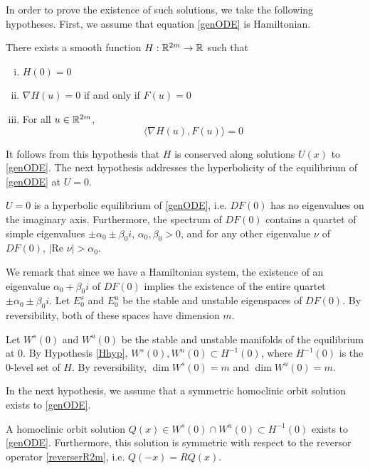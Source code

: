 \documentclass[thesis.tex]{subfiles}
\begin{document}
In order to prove the existence of such solutions, we take the following hypotheses. First, we assume that equation \eqref{genODE} is Hamiltonian.
\begin{hypothesis}\label{Hhyp}
There exists a smooth function $H: {\mathbb R}^{2m} \rightarrow {\mathbb R}$ such that 
\begin{enumerate}[(i)]
\item $H(0) = 0$
\item $\nabla H(u) = 0$ if and only if $F(u) = 0$
\item For all $u \in {\mathbb R}^{2m}$,
\begin{equation}
\langle \nabla H(u), F(u) \rangle = 0
\end{equation}
\end{enumerate}
\end{hypothesis}
It follows from this hypothesis that $H$ is conserved along solutions $U(x)$ to \eqref{genODE}. The next hypothesis addresses the hyperbolicity of the equilibrium of \eqref{genODE} at $U = 0$.  
\begin{hypothesis}\label{hypeqhyp}
$U = 0$ is a hyperbolic equilibrium of \eqref{genODE}, i.e. $DF(0)$ has no eigenvalues on the imaginary axis. Furthermore, the spectrum of $DF(0)$ contains a quartet of simple eigenvalues $\pm \alpha_0 \pm \beta_0 i$, $\alpha_0, \beta_0 > 0$, and for any other eigenvalue $\nu$ of $DF(0)$, $|\text{Re }\nu| > \alpha_0$.
\end{hypothesis}
We remark that since we have a Hamiltonian system, the existence of an eigenvalue $\alpha_0 + \beta_0 i$ of $DF(0)$ implies the existence of the entire quartet $\pm \alpha_0 \pm \beta_0 i$. Let $E_0^s$ and $E_0^u$ be the stable and unstable eigenspaces of $DF(0)$. By reversibility, both of these spaces have dimension $m$.

Let $W^s(0)$ and $W^u(0)$ be the stable and unstable manifolds of the equilibrium at 0. By Hypothesis \ref{Hhyp}, $W^s(0), W^u(0) \subset H^{-1}(0)$, where $H^{-1}(0)$ is the 0-level set of $H$. By reversibility, $\dim W^s(0) = m$ and $\dim W^u(0) = m$. 

In the next hypothesis, we assume that a symmetric homoclinic orbit solution exists to \eqref{genODE}.
\begin{hypothesis}\label{Qexistshyp}
A homoclinic orbit solution $Q(x) \in W^s(0) \cap W^u(0) \subset H^{-1}(0)$ exists to \eqref{genODE}. Furthermore, this solution is symmetric with respect to the reversor operator \eqref{reverserR2m}, i.e. $Q(-x) = R Q(x)$.
\end{hypothesis}
 
\end{document}
